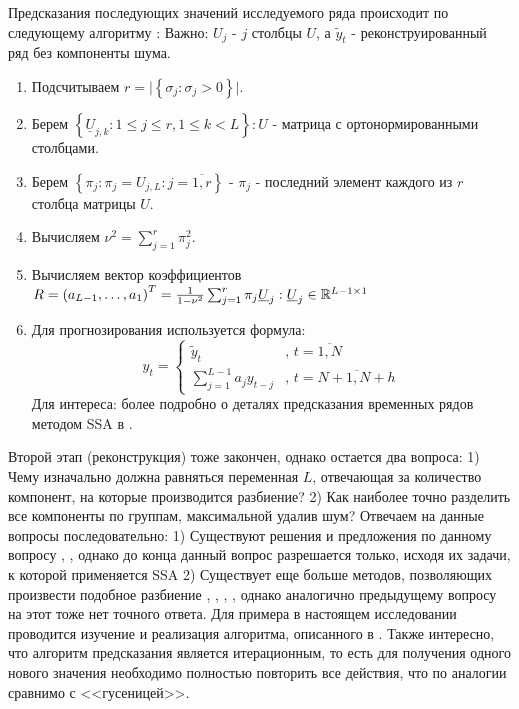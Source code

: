 Предсказания последующих значений исследуемого ряда происходит по следующему алгоритму \cite{catarpillar_ssa}:
Важно: ${U_j}$ - $j$ столбцы $U$, а ${\tilde{y}_t}$ - реконструированный ряд без компоненты шума.
\begin{enumerate}
	\item Подсчитываем ${r = \lvert \left\{\sigma_j: \sigma_j > 0 \right\} \rvert}$.
	\item Берем ${\left\{ \underline{U}_{j, k} : 1 \le j \le r, 1 \le k < L \right\}: U}$ -  матрица с ортонормированными столбцами.
	\item Берем ${\left\{\pi_j : \pi_j = U_{j, L}: j = \overline{1, r}\right\}}$ - ${\pi_j}$ - последний элемент каждого из $r$ столбца матрицы $U$.
	\item Вычисляем $\nu^2 = \sum_{j = 1}^r \pi_j^2$.
	\item Вычисляем вектор коэффициентов ${R = \left(a_{L - 1}, \ldots, a_{1}\right)^T = \frac{1}{1 - \nu^2} \sum_{j = 1}^r \pi_j \underline{U}_j}: \underline{U}_j \in \mathbb{R}^{L-1 \times 1}$
	\item Для прогнозирования используется формула:
	\begin{equation}
		y_t = 
		\left\{\begin{array}{ll}
			\displaystyle
			\tilde{y}_t & \text{, } t = \overline{1, N}\\
			\displaystyle
			\sum_{j = 1}^{L - 1}a_j y_{t - j} & \text{, } t = \overline{N+1, N + h}
		\end{array}\right.
	\end{equation}
	\noindent Для интереса: более подробно о деталях предсказания временных рядов методом SSA в \cite{catarpillar_ssa}.
\end{enumerate}

Второй этап (реконструкция) тоже закончен, однако остается два вопроса: 1) Чему изначально должна равняться переменная $L$, отвечающая за количество компонент, на которые производится разбиение? 2) Как наиболее точно разделить все компоненты по группам, максимальной удалив шум? Отвечаем на данные вопросы последовательно: 1) Существуют решения и предложения по данному вопросу \cite{catarpillar_ssa}, \cite{wang2015selection}, однако до конца данный вопрос разрешается только, исходя их задачи, к которой применяется SSA 2) Существует еще больше методов, позволяющих произвести подобное разбиение \cite{catarpillar_ssa}, \cite{kuang2020efficient}, \cite{lin2019grouping}, \cite{lin2016grouping}, однако аналогично предыдущему вопросу на этот тоже нет точного ответа. Для примера в настоящем исследовании проводится изучение и реализация алгоритма, описанного в \cite{kuang2020efficient}. Также интересно, что алгоритм предсказания является итерационным, то есть для получения одного нового значения необходимо полностью повторить все действия, что по аналогии сравнимо с <<гусеницей>>.

